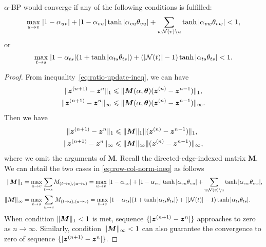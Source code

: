 \documentclass[conference,onecolumn]{IEEEtran}
\begin{document}
\begin{cor}
  $\alpha$-BP would converge if any of the following conditions is fulfilled:
  \begin{equation}
    \underset{u \rightarrow v}{\max}\;| 1-\alpha_{uv} | + | 1-\alpha_{vu} |\tanh{| \alpha_{vu} \theta_{vu} |} + \sum_{w \mathcal{N}(v) \backslash u} \tanh{| \alpha_{{vw}} \theta_{vw} |} < 1,
  \end{equation}
  or
  \begin{equation}
    \underset{t \rightarrow s}{\max}\; | 1-\alpha_{ts} | (1 + \tanh| \alpha_{ts} \theta_{ts} |) + (| \mathcal{N}(t) |-1)\tanh| \alpha_{ts} \theta_{ts} | < 1.
  \end{equation}

\end{cor}

\begin{proof}
  From inequality~\ref{eq:ratio-update-ineq}, we can have
  \begin{align}
    \| \bm{z}^{(n+1)} - \bm{z}^{n} \|_{1} &\leqslant \| \bm{M}(\alpha, \bm{\theta})(\bm{z}^{(n)} - \bm{z}^{n-1}) \|_{1}, \nonumber \\
    \| \bm{z}^{(n+1)} - \bm{z}^{n} \|_{\infty} &\leqslant \| \bm{M}(\alpha, \bm{\theta})(\bm{z}^{(n)} - \bm{z}^{n-1}) \|_{\infty}.
  \end{align}
  Then we have
  \begin{align}\label{eq:row-col-norm-ineq}
    \| \bm{z}^{(n+1)} - \bm{z}^{n} \|_{1} &\leqslant \| \bm{M} \|_{1}\| (\bm{z}^{(n)} - \bm{z}^{n-1}) \|_{1}, \nonumber \\
    \| \bm{z}^{(n+1)} - \bm{z}^{n} \|_{\infty} &\leqslant \| \bm{M} \|_{\infty}\| (\bm{z}^{(n)} - \bm{z}^{n-1}) \|_{\infty},
  \end{align}
  where we omit the arguments of $\bm{M}$. Recall the directed-edge-indexed matrix $\bm{M}$. We can detail the two cases in \ref{eq:row-col-norm-ineq} as follows
  \begin{align}
    \| \bm{M} \|_{1} &= \underset{u \rightarrow v}{\max}\;{\sum_{t\rightarrow s} M_{(t\rightarrow s), (u\rightarrow v)}} = \underset{u \rightarrow v}{\max}\;| 1-\alpha_{uv} | + | 1-\alpha_{vu} |\tanh{| \alpha_{vu} \theta_{vu} |} + \sum_{w \mathcal{N}(v) \backslash u} \tanh{| \alpha_{{vw}} \theta_{vw} |}, \nonumber \\
    \| \bm{M} \|_{\infty} &= \underset{t \rightarrow s}{\max}\;{\sum_{u\rightarrow v} M_{(t\rightarrow s), (u\rightarrow v)}} = \underset{t \rightarrow s}{\max}\; | 1-\alpha_{ts} | (1 + \tanh| \alpha_{ts} \theta_{ts} |) + (| \mathcal{N}(t) |-1)\tanh| \alpha_{ts} \theta_{ts} |.
  \end{align}
  When condition $\| \bm{M} \|_{1} < 1$ is met, sequence $\{| \bm{z}^{(n+1)} - \bm{z}^{n} |\}$ approaches to zero as $n\rightarrow \infty$. Similarly, condition $\| \bm{M} \|_{\infty}<1$ can also guarantee the convergence to zero of sequence $\{| \bm{z}^{(n+1)} - \bm{z}^{n} |\}$.
  
\end{proof}
\end{document}
